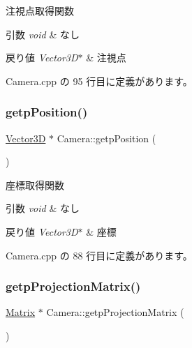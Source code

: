 注視点取得関数 


\begin{DoxyParams}{引数}
{\em void} & なし \\
\hline
\end{DoxyParams}

\begin{DoxyRetVals}{戻り値}
{\em Vector3\+D$\ast$} & 注視点 \\
\hline
\end{DoxyRetVals}


 Camera.\+cpp の 95 行目に定義があります。

\mbox{\label{class_camera_a3384dbae97724934c5083740a30f4a98}} 
\subsubsection{\texorpdfstring{getp\+Position()}{getpPosition()}}
{\footnotesize\ttfamily \mbox{\hyperlink{class_vector3_d}{Vector3D}} $\ast$ Camera\+::getp\+Position (\begin{DoxyParamCaption}{ }\end{DoxyParamCaption})}



座標取得関数 


\begin{DoxyParams}{引数}
{\em void} & なし \\
\hline
\end{DoxyParams}

\begin{DoxyRetVals}{戻り値}
{\em Vector3\+D$\ast$} & 座標 \\
\hline
\end{DoxyRetVals}


 Camera.\+cpp の 88 行目に定義があります。

\mbox{\label{class_camera_a68b2c96bfda62c6d8e6a77e38c396e8a}} 
\subsubsection{\texorpdfstring{getp\+Projection\+Matrix()}{getpProjectionMatrix()}}
{\footnotesize\ttfamily \mbox{\hyperlink{class_matrix}{Matrix}} $\ast$ Camera\+::getp\+Projection\+Matrix (\begin{DoxyParamCaption}{ }\end{DoxyParamCaption})}



